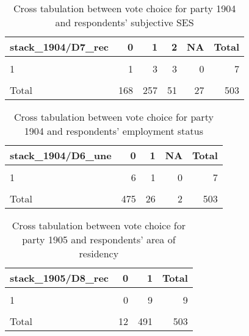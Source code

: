 \documentclass[
]{article}
\begin{document}
\begin{table}

\caption{\label{tab:unnamed-chunk-126}Cross tabulation between vote choice for party 1904 and respondents' subjective SES 
                   \label{table:crosstab_4_2_mt}}
\centering
\begin{tabular}[t]{l|r|r|r|r|r}
\hline
stack\_1904/D7\_rec & 0 & 1 & 2 & NA & Total\\
\hline
\cellcolor{gray!6}{0} & \cellcolor{gray!6}{127} & \cellcolor{gray!6}{194} & \cellcolor{gray!6}{35} & \cellcolor{gray!6}{14} & \cellcolor{gray!6}{370}\\
\hline
1 & 1 & 3 & 3 & 0 & 7\\
\hline
\cellcolor{gray!6}{NA} & \cellcolor{gray!6}{40} & \cellcolor{gray!6}{60} & \cellcolor{gray!6}{13} & \cellcolor{gray!6}{13} & \cellcolor{gray!6}{126}\\
\hline
Total & 168 & 257 & 51 & 27 & 503\\
\hline
\end{tabular}
\end{table}

\begin{table}

\caption{\label{tab:unnamed-chunk-126}Cross tabulation between vote choice for party 1904 and respondents' employment status 
                  \label{table:crosstab_4_3_mt}}
\centering
\begin{tabular}[t]{l|r|r|r|r}
\hline
stack\_1904/D6\_une & 0 & 1 & NA & Total\\
\hline
\cellcolor{gray!6}{0} & \cellcolor{gray!6}{352} & \cellcolor{gray!6}{16} & \cellcolor{gray!6}{2} & \cellcolor{gray!6}{370}\\
\hline
1 & 6 & 1 & 0 & 7\\
\hline
\cellcolor{gray!6}{NA} & \cellcolor{gray!6}{117} & \cellcolor{gray!6}{9} & \cellcolor{gray!6}{0} & \cellcolor{gray!6}{126}\\
\hline
Total & 475 & 26 & 2 & 503\\
\hline
\end{tabular}
\end{table}

\begin{table}

\caption{\label{tab:unnamed-chunk-126}Cross tabulation between vote choice for party 1905 and respondents' area of residency 
                   \label{table:crosstab_5_1_mt}}
\centering
\begin{tabular}[t]{l|r|r|r}
\hline
stack\_1905/D8\_rec & 0 & 1 & Total\\
\hline
\cellcolor{gray!6}{0} & \cellcolor{gray!6}{4} & \cellcolor{gray!6}{364} & \cellcolor{gray!6}{368}\\
\hline
1 & 0 & 9 & 9\\
\hline
\cellcolor{gray!6}{NA} & \cellcolor{gray!6}{8} & \cellcolor{gray!6}{118} & \cellcolor{gray!6}{126}\\
\hline
Total & 12 & 491 & 503\\
\hline
\end{tabular}
\end{table}
\end{document}
